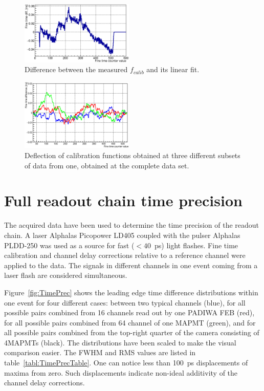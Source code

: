\documentclass[final,5p,times,twocolumn]{elsarticle}
\begin{document}
\begin{figure}[tbh]
	\centering
	\includegraphics[width=0.48\textwidth]{figures/CalTableMinusFit_0010_01_feb2017.eps}
	\caption{Difference between the measured $ f_{calib} $ and its linear fit.}
	\label{fig:CalibTableMinusLinear}
\end{figure}

\begin{figure}[tbh]
	\centering
	\includegraphics[width=0.48\textwidth]{figures/Stability_01_diff.eps}
	\caption{Deflection of calibration functions obtained at three different subsets of data from one, obtained at the complete data set.}
	\label{fig:CalibStability}
\end{figure}

\section{Full readout chain time precision}

The acquired data have been used to determine the time precision of the readout chain. A laser Alphalas Picopower LD405 coupled with the pulser Alphalas PLDD-250 \cite{LASER} was used as a source for fast ($<40$~ps) light flashes. Fine time calibration and channel delay corrections relative to a reference channel were applied to the data. The signals in different channels in one event coming from a laser flash are considered simultaneous.

Figure~\ref{fig:TimePrec} shows the leading edge time difference distributions within one event for four different cases:
between two typical channels (blue), for all possible pairs combined from 16 channels read out by one PADIWA FEB (red), for all possible pairs combined from 64 channel of one MAPMT (green), and for all possible pairs combined from the top-right quarter of the camera consisting of 4MAPMTs (black).
The distributions have been scaled to make the visual comparison easier. The FWHM and RMS values are listed in table~\ref{tabl:TimePrecTable}.
One can notice less than 100~ps displacements of maxima from zero. Such displacements indicate non-ideal additivity of the channel delay corrections.
\end{document}
